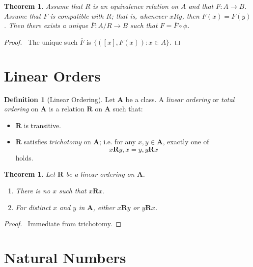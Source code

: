 \documentclass{article}
\let\qed\relax
\newtheorem{theorem}[axiom]{Theorem}
\theoremstyle{definition}
\newtheorem{definition}[axiom]{Definition}
\begin{document}
    \begin{theorem}
        Assume that $R$ is an equivalence relation on $A$ and that $F : A \rightarrow B$.
        Assume that $F$ is \emph{compatible} with $R$; that is, whenever $xRy$, then $F(x) = F(y)$.
        Then there exists a unique $\overline{F} : A / R \rightarrow B$ such that $F = \overline{F} \circ \phi$.
    \end{theorem}

    \begin{proof}
        \pf\ The unique such $\overline{F}$ is $\{ ([x],F(x)) : x \in A \}$. \qed
    \end{proof}

    \section{Linear Orders}

    \begin{definition}[Linear Ordering]
        Let $\mathbf{A}$ be a class. A \emph{linear ordering} or \emph{total ordering} on $\mathbf{A}$
        is a relation $\mathbf{R}$ on $\mathbf{A}$ such that:
        \begin{itemize}
            \item $\mathbf{R}$ is transitive.
            \item $\mathbf{R}$ satisfies \emph{trichotomy} on $\mathbf{A}$; i.e. for any $x, y \in \mathbf{A}$,
            exactly one of
            \[ x\mathbf{R}y, x=y, y\mathbf{R}x \]
            holds.
        \end{itemize}
    \end{definition}

    \begin{theorem}
        Let $\mathbf{R}$ be a linear ordering on $\mathbf{A}$.
        \begin{enumerate}
            \item There is no $x$ such that $x \mathbf{R} x$.
            \item For distinct $x$ and $y$ in $\mathbf{A}$, either $x\mathbf{R}y$ or $y\mathbf{R}x$.
        \end{enumerate}
    \end{theorem}

    \begin{proof}
        \pf\ Immediate from trichotomy. \qed
    \end{proof}

    \section{Natural Numbers}
\end{document}
